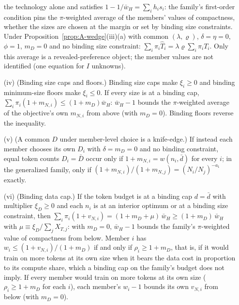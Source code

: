 \begin{proposition}
\begin{enumerate}
the technology alone and satisfies $1-1/\bar w_H=\sum_ih_is_i$: the family's first-order condition pins the
$\pi$-weighted average of the members' values of compactness, whether the sizes are chosen at the margin or set by
binding size constraints. Under Proposition~\ref{prop:A-wedge}(iii)(a) with common $(\lambda,\varrho)$, $\delta=\eta=0$,
$\phi=1$, $m_D=0$ and no binding size constraint: $\sum_i\pi_i\hat T_i=\lambda\varrho\sum_i\pi_iT_i$. Only this average is
a revealed-preference object; the member values are not identified (one equation for $I$ unknowns).
\item[(iv)] (Binding size caps and floors.) Binding size caps make $\xi_i\ge0$ and binding minimum-size floors make
$\xi_i\le0$. If every size is at a binding cap, $\sum_i\pi_i(1+m_{N,i})\le(1+m_D)\bar w_H$: $\bar w_H-1$ bounds the
$\pi$-weighted average of the objective's own $m_{N,i}$ from above (with $m_D=0$). Binding floors reverse the inequality.
\item[(v)] (A common $D$ under member-level choice is a knife-edge.) If instead each member chooses its own $D_i$ with
$\delta=m_D=0$ and no binding constraint, equal token counts $D_i=\bar D$ occur only if $1+m_{N,i}=w(n_i,\bar d)$ for every
$i$; in the generalized family, only if $(1+m_{N,i})/(1+m_{N,j})=(N_i/N_j)^{-a_1}$ exactly.
\item[(vi)] (Binding data cap.) If the token budget is at a binding cap $d=\bar d$ with multiplier $\xi_D\ge0$ and each
$n_i$ is at an interior optimum or at a binding size constraint, then
$\sum_i\pi_i(1+v_{N,i})=(1+m_D+\mu)\,\bar w_H\ge(1+m_D)\,\bar w_H$ with $\mu\equiv\xi_D/\sum_jX_{T,j}$: with $m_D=0$,
$\bar w_H-1$ bounds the family's $\pi$-weighted value of compactness from below. Member $i$ has
$w_i\le(1+v_{N,i})/(1+m_D)$ if and only if $\rho_i\ge1+m_D$, that is, if it would train on more tokens at its own size
when it bears the data cost in proportion to its compute share, which a binding cap on the family's budget does not
imply. If every member would train on more tokens at its own size
($\rho_i\ge1+m_D$ for each $i$), each member's $w_i-1$ bounds its own $v_{N,i}$ from below (with $m_D=0$).
\end{enumerate}
\end{proposition}

